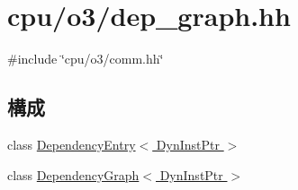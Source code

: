 \hypertarget{dep__graph_8hh}{
\section{cpu/o3/dep\_\-graph.hh}
\label{dep__graph_8hh}
}
{\ttfamily \#include \char`\"{}cpu/o3/comm.hh\char`\"{}}\par
\subsection*{構成}
\begin{DoxyCompactItemize}
\item 
class \hyperlink{classDependencyEntry}{DependencyEntry$<$ DynInstPtr $>$}
\item 
class \hyperlink{classDependencyGraph}{DependencyGraph$<$ DynInstPtr $>$}
\end{DoxyCompactItemize}
